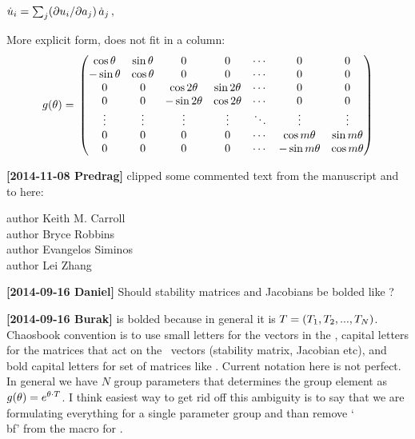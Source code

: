 \( %
 \dot{ u}_i= \sum_j ({\partial u_i}/{\partial \ssp_j}) \, \dot{\ssp}_j
 \,,
\) %


More explicit form, does not fit in a column:
\[
	 g (\theta)= \\
					  \begin{pmatrix}
					  \cos \theta & \sin \theta & 0               & 0              & \cdots & 0              & 0               \\
					 -\sin \theta & \cos \theta & 0               & 0              & \cdots & 0              & 0               \\
					  0             & 0 		   & \cos 2 \theta & \sin 2 \theta & \cdots & 0              & 0               \\
					  0             & 0            &-\sin 2 \theta & \cos 2 \theta & \cdots & 0              & 0               \\
					  \vdots       & \vdots      & \vdots         & \vdots        & \ddots & \vdots         & \vdots         \\
					  0             & 0 		   & 0               & 0              & \cdots & \cos m \theta & \sin m \theta  \\
					  0             & 0            & 0	             & 0              & \cdots &-\sin m \theta & \cos m \theta
					  \end{pmatrix}
\]


{\bf[2014-11-08 Predrag]} clipped some commented text from the manuscript
and to here:

\noindent
author{ Keith M. Carroll} \\%
author{ Bryce Robbins} \\%
author{ Evangelos Siminos}  \\ %
author{ Lei Zhang} %

{\bf[2014-09-16 Daniel]}
Should stability matrices and Jacobians be bolded like \Lg?

{\bf[2014-09-16 Burak]}
\Lg is bolded because in general it is ${T} = ({T}_1,
{T}_2, ..., {T}_N)$. Chaosbook convention is to use small letters for the
vectors in the \statesp , capital letters for the matrices that act on
the \statesp\ vectors (stability matrix, Jacobian etc), and bold capital
letters for set of matrices like \Lg . Current notation here is not
perfect. In general we have $N$ group parameters that determines the
group element as $g({\bf \theta}) = e^{\theta \cdot {T}}$. I think easiest way
to get rid off this ambiguity is to say that we are formulating
everything for a single parameter group and than remove `\\bf' from the
macro for \Lg .


